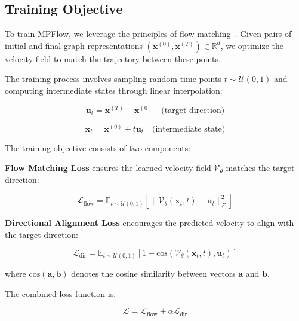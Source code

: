 \documentclass{article}
\begin{document}
\subsection{Training Objective}

To train MPFlow, we leverage the principles of flow matching~\citep{lipman2022flow}. 
Given pairs of initial and final graph representations $(\mathbf{x}^{(0)}, \mathbf{x}^{(T)}) \in \mathbb{R}^d$, we optimize the velocity field to match the trajectory between these points.

The training process involves sampling random time points $t \sim \mathcal{U}(0,1)$ and computing intermediate states through linear interpolation:

\begin{equation}
\mathbf{u}_t = \mathbf{x}^{(T)} - \mathbf{x}^{(0)} \quad \text{(target direction)}
\end{equation}

\begin{equation}
\mathbf{x}_t = \mathbf{x}^{(0)} + t\mathbf{u}_t \quad \text{(intermediate state)}
\end{equation}

The training objective consists of two components:

\textbf{Flow Matching Loss} ensures the learned velocity field $\mathcal{V}_\theta$ matches the target direction:

\begin{equation}
\mathcal{L}_{\text{flow}} = \mathbb{E}_{t \sim \mathcal{U}(0,1)}\left[\|\mathcal{V}_\theta(\mathbf{x}_t, t) - \mathbf{u}_t\|_F^2\right]
\end{equation}

\textbf{Directional Alignment Loss} encourages the predicted velocity to align with the target direction:

\begin{equation}
\mathcal{L}_{\text{dir}} = \mathbb{E}_{t \sim \mathcal{U}(0,1)}\left[1 - \text{cos}\left(\mathcal{V}_\theta(\mathbf{x}_t, t), \mathbf{u}_t\right)\right]
\end{equation}

where $\text{cos}(\mathbf{a}, \mathbf{b})$ denotes the cosine similarity between vectors $\mathbf{a}$ and $\mathbf{b}$.

The combined loss function is:

\begin{equation}
\mathcal{L} = \mathcal{L}_{\text{flow}} + \alpha \mathcal{L}_{\text{dir}}
\end{equation}
\end{document}
